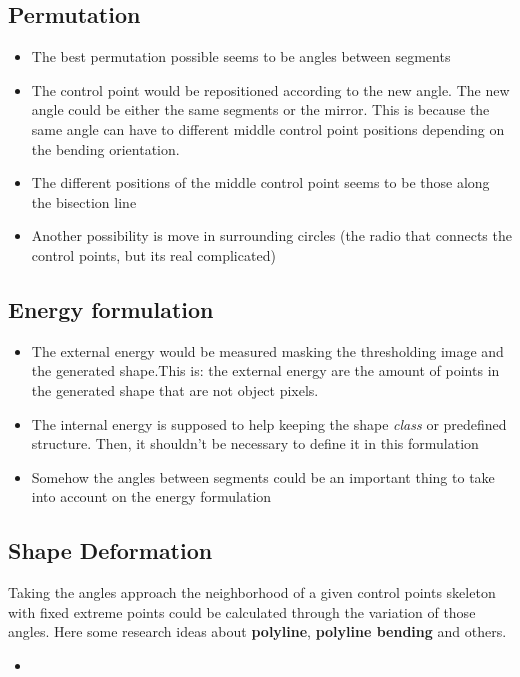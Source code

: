 \documentclass{article}
\begin{document}
\subsection*{Permutation}
\begin{itemize}
\item The best permutation possible seems to be angles between segments
\item The control point would be repositioned according to the new angle.
  The new angle could be either the same segments or the mirror. This is
  because the same angle can have to different middle control point positions
  depending on the bending orientation.
\item The different positions of the middle control point seems to be those
  along the bisection line
\item Another possibility is move in surrounding circles (the radio that
  connects the control points, but its real complicated)
\end{itemize}

\subsection*{Energy formulation}


\begin{itemize}
\item The external energy would be measured masking the thresholding image
  and the generated shape.This is: the external energy are the amount of
  points in the generated shape that are not object pixels.
\item The internal energy is supposed to help keeping the shape \emph{class}
  or predefined structure. Then, it shouldn't be necessary to define it 
  in this formulation
\item Somehow the angles between segments could be an important thing to
  take into account on the energy formulation
\end{itemize}

\subsection*{Shape Deformation}
Taking the angles approach the neighborhood of a given control points skeleton
with fixed extreme points could be calculated through the variation of those
angles. Here some research ideas about \textbf{polyline}, 
\textbf{polyline bending} and others.

\begin{itemize}
\item 
\end{itemize}
\end{document}

